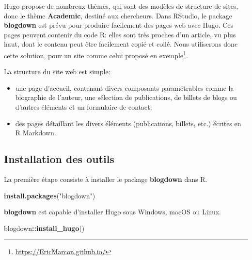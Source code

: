 \documentclass[
  12pt,
  french,
  a4paper,
  extrafontsizes,onecolumn,openright
  ]{memoir}
\newenvironment{Shaded}{\begin{snugshade}}{\end{snugshade}}
\newcommand{\KeywordTok}[1]{\textcolor[rgb]{0.13,0.29,0.53}{\textbf{#1}}}
\newcommand{\NormalTok}[1]{#1}
\newcommand{\OperatorTok}[1]{\textcolor[rgb]{0.81,0.36,0.00}{\textbf{#1}}}
\newcommand{\StringTok}[1]{\textcolor[rgb]{0.31,0.60,0.02}{#1}}
\providecommand{\tightlist}{%
  \setlength{\itemsep}{0pt}\setlength{\parskip}{0pt}}
\begin{document}
Hugo propose de nombreux thèmes, qui sont des modèles de structure de sites, donc le thème \textbf{Academic}, destiné aux chercheurs.
Dans RStudio, le package \textbf{blogdown} est prévu pour produire facilement des pages web avec Hugo.
Ces pages peuvent contenir du code R: elles sont très proches d'un article, vu plus haut, dont le contenu peut être facilement copié et collé.
Nous utiliserons donc cette solution, pour un site comme celui proposé en exemple\footnote{\url{https://EricMarcon.github.io/}}.

La structure du site web est simple:

\begin{itemize}
\tightlist
\item
  une page d'accueil, contenant divers composants paramétrables comme la biographie de l'auteur, une sélection de publications, de billets de blogs ou d'autres éléments et un formulaire de contact;
\item
  des pages détaillant les divers éléments (publications, billets, etc.) écrites en R Markdown.
\end{itemize}

\hypertarget{installation-des-outils}{%
\subsection{Installation des outils}\label{installation-des-outils}}

La première étape consiste à installer le package \textbf{blogdown} dans R.

\scriptsize

\begin{Shaded}
\begin{Highlighting}[]
\KeywordTok{install.packages}\NormalTok{(}\StringTok{"blogdown"}\NormalTok{)}
\end{Highlighting}
\end{Shaded}

\normalsize

\textbf{blogdown} est capable d'installer Hugo sous Windows, macOS ou Linux.

\scriptsize

\begin{Shaded}
\begin{Highlighting}[]
\NormalTok{blogdown}\OperatorTok{::}\KeywordTok{install_hugo}\NormalTok{()}
\end{Highlighting}
\end{Shaded}

\normalsize
\end{document}
